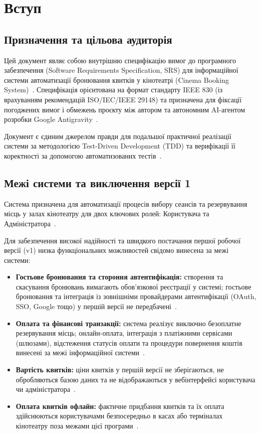 \section{Вступ}\label{sec:vstup}

\subsection{Призначення та цільова аудиторія}\label{sec:vstup-meta}
Цей документ являє собою внутрішню специфікацію вимог до програмного забезпечення (Software Requirements Specification, SRS) для інформаційної системи автоматизації бронювання квитків у кінотеатрі (Cinema Booking System)~. Специфікація орієнтована на формат стандарту IEEE 830 (із врахуванням рекомендацій ISO/IEC/IEEE 29148) та призначена для фіксації погоджених вимог і обмежень проєкту між автором та автономним AI-агентом розробки Google Antigravity~.

Документ є єдиним джерелом правди для подальшої практичної реалізації системи за методологією Test-Driven Development (TDD) та верифікації її коректності за допомогою автоматизованих тестів~.

\subsection{Межі системи та виключення версії 1}\label{sec:vstup-mezhi}
Система призначена для автоматизації процесів вибору сеансів та резервування місць у залах кінотеатру для двох ключових ролей: Користувача та Адміністратора~. 

Для забезпечення високої надійності та швидкого постачання першої робочої версії (v1) низка функціональних можливостей свідомо винесена за межі системи:
\begin{itemize}
    \item \textbf{Гостьове бронювання та стороння автентифікація:} створення та скасування бронювань вимагають обов'язкової реєстрації у системі; гостьове бронювання та інтеграція із зовнішніми провайдерами автентифікації (OAuth, SSO, Google тощо) у першій версії не передбачені~.
    \item \textbf{Оплата та фінансові транзакції:} система реалізує виключно безоплатне резервування місць; онлайн-оплата, інтеграція з платіжними сервісами (шлюзами), відстеження статусів оплати та процедури повернення коштів винесені за межі інформаційної системи~.
    \item \textbf{Вартість квитків:} ціни квитків у першій версії не зберігаються, не обробляються базою даних та не відображаються у вебінтерфейсі користувача чи адміністратора~.
    \item \textbf{Оплата квитків офлайн:} фактичне придбання квитків та їх оплата здійснюються користувачами безпосередньо в касах або терміналах кінотеатру поза межами цієї програми~.
\end{itemize}

